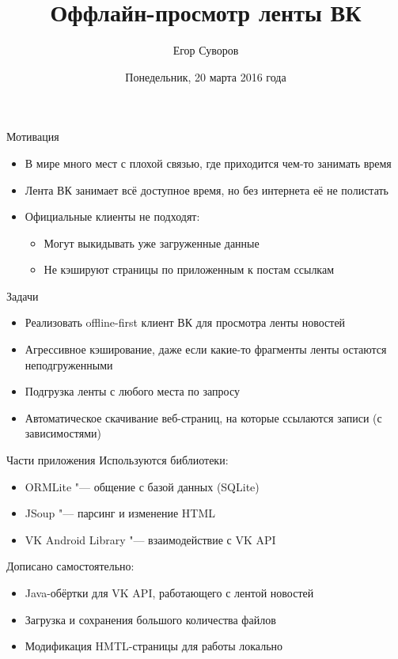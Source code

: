 \documentclass[utf8,xcolor=table]{beamer}
\title{Оффлайн-просмотр ленты ВК}
\author{Егор Суворов}
\institute[СПб АУ]{Практика, осень 2015--зима 2016}
\date[21.03.2016]{Понедельник, 20 марта 2016 года}
\begin{document}
\begin{frame}
\titlepage
\end{frame}

\begin{frame}[t]{Мотивация}
	\begin{itemize}
		\item В мире много мест с плохой связью, где приходится чем-то занимать время
		\item Лента ВК занимает всё доступное время, но без интернета её не полистать
		\item Официальные клиенты не подходят:
			\begin{itemize}
				\item Могут выкидывать уже загруженные данные
				\item Не кэшируют страницы по приложенным к постам ссылкам
			\end{itemize}
	\end{itemize}
\end{frame}

\begin{frame}[t]{Задачи}
	\begin{itemize}
		\item Реализовать offline-first клиент ВК для просмотра ленты новостей
		\item Агрессивное кэширование, даже если какие-то фрагменты ленты остаются неподгруженными
		\item Подгрузка ленты с любого места по запросу
		\item Автоматическое скачивание веб-страниц, на которые ссылаются записи (с зависимостями)
	\end{itemize}
\end{frame}

\begin{frame}[t]{Части приложения}
	Используются библиотеки:
	\begin{itemize}
		\item ORMLite "--- общение с базой данных (SQLite)
		\item JSoup "--- парсинг и изменение HTML
		\item VK Android Library "--- взаимодействие с VK API
	\end{itemize}
	Дописано самостоятельно:
	\begin{itemize}
		\item Java-обёртки для VK API, работающего с лентой новостей
		\item Загрузка и сохранения большого количества файлов
		\item Модификация HMTL-страницы для работы локально
	\end{itemize}
\end{frame}
\end{document}
